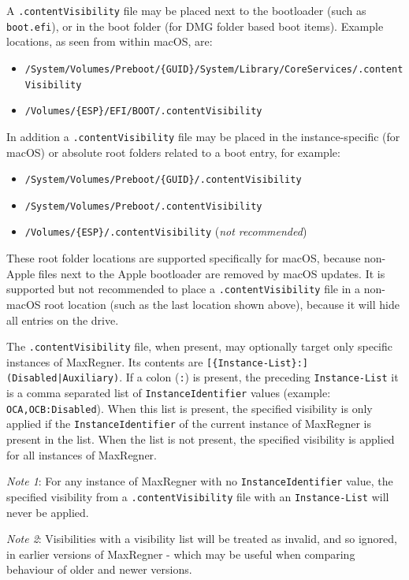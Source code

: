 \documentclass[]{article}
\providecommand{\tightlist}{%
  \setlength{\itemsep}{0pt}\setlength{\parskip}{0pt}}
\begin{document}
A \texttt{.contentVisibility} file may be placed next to the bootloader (such as \texttt{boot.efi}),
or in the boot folder (for DMG folder based boot items). Example locations, as seen from within macOS, are:
\begin{itemize}
\tightlist
\item \texttt{/System/Volumes/Preboot/\{GUID\}/System/Library/CoreServices/.contentVisibility}
\item \texttt{/Volumes/\{ESP\}/EFI/BOOT/.contentVisibility}
\end{itemize}
In addition a \texttt{.contentVisibility} file may be placed in the instance-specific (for macOS) or absolute
root folders related to a boot entry, for example:
\begin{itemize}
\tightlist
\item \texttt{/System/Volumes/Preboot/\{GUID\}/.contentVisibility}
\item \texttt{/System/Volumes/Preboot/.contentVisibility}
\item \texttt{/Volumes/\{ESP\}/.contentVisibility} (\emph{not recommended})
\end{itemize}
These root folder locations are supported specifically for macOS, because non-Apple files next to the Apple bootloader
are removed by macOS updates. It is supported but not recommended to place a \texttt{.contentVisibility} file in a
non-macOS root location (such as the last location shown above), because it will hide all entries on the drive.

The \texttt{.contentVisibility} file, when present, may optionally target only specific instances
of MaxRegner. Its contents are \texttt{[\{Instance-List\}:](Disabled|Auxiliary)}.
If a colon (\texttt{:}) is present, the preceding \texttt{Instance-List} it is a comma separated
list of \texttt{InstanceIdentifier} values (example: \texttt{OCA,OCB:Disabled}).
When this list is present, the specified visibility is only applied if the
\texttt{InstanceIdentifier} of the current instance of MaxRegner is present in the list.
When the list is not present, the specified visibility is applied for all instances of MaxRegner.

\emph{Note 1}: For any instance of MaxRegner with no \texttt{InstanceIdentifier} value, the specified visibility
from a \texttt{.contentVisibility} file with an \texttt{Instance-List} will never be applied.

\emph{Note 2}: Visibilities with a visibility list will be treated as invalid, and so ignored, in earlier
versions of MaxRegner - which may be useful when comparing behaviour of older and newer versions.
\end{document}
